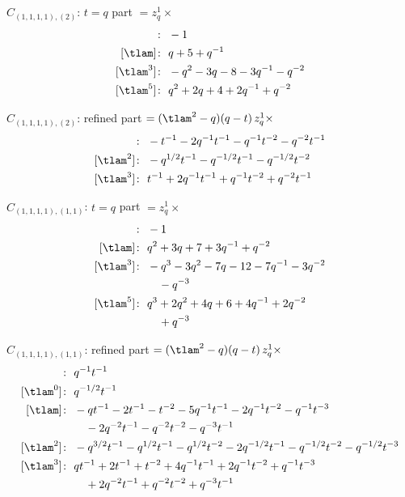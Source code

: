 $\hat C_{(1,1,1,1),(2)}$: $t = q$ part $= z_q^{1} \times$
\begin{align*}
[\tlam^{-1}]\colon\ & -1 \\
[\tlam]\colon\ & q +5 +q^{-1} \\
[\tlam^{3}]\colon\ & -q^{2} -3 q -8 -3 q^{-1} -q^{-2} \\
[\tlam^{5}]\colon\ & q^{2} +2 q +4 +2 q^{-1} +q^{-2}
\end{align*}

$\hat C_{(1,1,1,1),(2)}$: refined part $= (\tlam^2 - q)(q - t)\, z_q^{1} \times$
\begin{align*}
[\tlam]\colon\ & -t^{-1} -2 q^{-1} t^{-1} -q^{-1} t^{-2} -q^{-2} t^{-1} \\
[\tlam^{2}]\colon\ & -q^{1/2} t^{-1} -q^{-1/2} t^{-1} -q^{-1/2} t^{-2} \\
[\tlam^{3}]\colon\ & t^{-1} +2 q^{-1} t^{-1} +q^{-1} t^{-2} +q^{-2} t^{-1}
\end{align*}

$\hat C_{(1,1,1,1),(1,1)}$: $t = q$ part $= z_q^{1} \times$
\begin{align*}
[\tlam^{-1}]\colon\ & -1 \\
[\tlam]\colon\ & q^{2} +3 q +7 +3 q^{-1} +q^{-2} \\
[\tlam^{3}]\colon\ & -q^{3} -3 q^{2} -7 q -12 -7 q^{-1} -3 q^{-2} \\
& \quad -q^{-3} \\
[\tlam^{5}]\colon\ & q^{3} +2 q^{2} +4 q +6 +4 q^{-1} +2 q^{-2} \\
& \quad +q^{-3}
\end{align*}

$\hat C_{(1,1,1,1),(1,1)}$: refined part $= (\tlam^2 - q)(q - t)\, z_q^{1} \times$
\begin{align*}
[\tlam^{-1}]\colon\ & q^{-1} t^{-1} \\
[\tlam^{0}]\colon\ & q^{-1/2} t^{-1} \\
[\tlam]\colon\ & -q t^{-1} -2 t^{-1} -t^{-2} -5 q^{-1} t^{-1} -2 q^{-1} t^{-2} -q^{-1} t^{-3} \\
& \quad -2 q^{-2} t^{-1} -q^{-2} t^{-2} -q^{-3} t^{-1} \\
[\tlam^{2}]\colon\ & -q^{3/2} t^{-1} -q^{1/2} t^{-1} -q^{1/2} t^{-2} -2 q^{-1/2} t^{-1} -q^{-1/2} t^{-2} -q^{-1/2} t^{-3} \\
[\tlam^{3}]\colon\ & q t^{-1} +2 t^{-1} +t^{-2} +4 q^{-1} t^{-1} +2 q^{-1} t^{-2} +q^{-1} t^{-3} \\
& \quad +2 q^{-2} t^{-1} +q^{-2} t^{-2} +q^{-3} t^{-1}
\end{align*}

